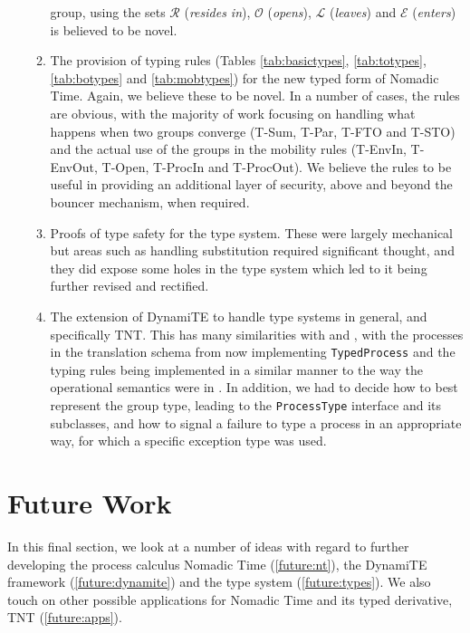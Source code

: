 \begin{enumerate}
\begin{enumerate}[\bfseries {C3.}1]
  group, using the sets $\mathscr{R}$ (\emph{resides in}),
  $\mathscr{O}$ (\emph{opens}), $\mathscr{L}$ (\emph{leaves}) and
  $\mathscr{E}$ (\emph{enters}) is believed to be novel.
\item The provision of typing rules (Tables \ref{tab:basictypes},
  \ref{tab:totypes}, \ref{tab:botypes} and \ref{tab:mobtypes}) for the
  new typed form of Nomadic Time.  Again, we believe these to be
  novel.  In a number of cases, the rules are obvious, with the
  majority of work focusing on handling what happens when two groups
  converge (T-Sum, T-Par, T-FTO and T-STO) and the actual use of the
  groups in the mobility rules (T-EnvIn, T-EnvOut, T-Open, T-ProcIn
  and T-ProcOut).  We believe the rules to be useful in providing an
  additional layer of security, above and beyond the bouncer
  mechanism, when required.
\item Proofs of type safety for the type system.  These were largely
  mechanical but areas such as handling substitution required
  significant thought, and they did expose some holes in the type
  system which led to it being further revised and rectified.
\item The extension of DynamiTE to handle type systems in general, and
  specifically TNT.  This has many similarities with  and
  , with the processes in the translation schema from
   now implementing \texttt{TypedProcess} and the typing
  rules being implemented in a similar manner to the way the
  operational semantics were in .  In addition, we had to
  decide how to best represent the group type, leading to the
  \texttt{ProcessType} interface and its subclasses, and how to signal
  a failure to type a process in an appropriate way, for which a
  specific exception type was used.
\end{enumerate}
\end{enumerate}

\section{Future Work}
\label{futureworksect}

In this final section, we look at a number of ideas with regard to
further developing the process calculus Nomadic Time
(\ref{future:nt}), the DynamiTE framework (\ref{future:dynamite}) and
the type system (\ref{future:types}).  We also touch on other possible
applications for Nomadic Time and its typed derivative, TNT
(\ref{future:apps}).

